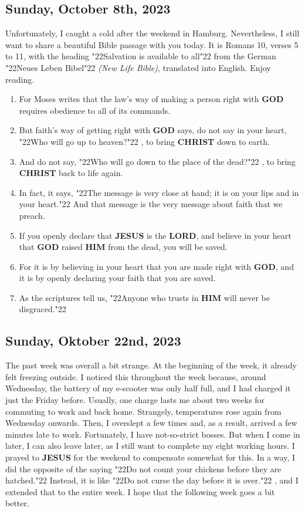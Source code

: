 \documentclass[12pt,a5paper]{article}
\newcommand{\Christ}[0]{\textbf{CHRIST}}
\newcommand{\God}[0]{\textbf{GOD}}
\newcommand{\Him}[0]{\textbf{HIM}}
\newcommand{\Jesus}[0]{\textbf{JESUS}}
\newcommand{\Lord}[0]{\textbf{LORD}}
\newcommand{\q}[1]{\char"22{#1}\char"22 }
\begin{document}
	\subsection{Sunday, October 8th, 2023}
		Unfortunately,
		I caught a cold after the weekend in Hamburg.
		Nevertheless,
		I still want to share a beautiful Bible passage with you today.
		It is Romans 10,
		verses 5 to 11,
		with the heading
		\q{Salvation is available to all}
		from the German \q{Neues Leben Bibel} \textit{(New Life Bible)},
		translated into English.
		Enjoy reading.
		\begin{enumerate}[nosep,start=5]
			\item	For Moses writes that the law’s way of making a person right with {\God} requires obedience to all of its commands.
			\item	But faith’s way of getting right with {\God} says,
					do not say in your heart,
					\q{Who will go up to heaven?},
					to bring {\Christ} down to earth.
			\item	And do not say,
					\q{Who will go down to the place of the dead?},
					to bring {\Christ} back to life again.
			\item	In fact,
					it says,
					\q{The message is very close at hand;
					it is on your lips and in your heart.}
					And that message is the very message about faith that we preach.
			\item	If you openly declare that {\Jesus} is the {\Lord},
					and believe in your heart that {\God} raised {\Him} from the dead,
					you will be saved.
			\item	For it is by believing in your heart that you are made right with {\God},
					and it is by openly declaring your faith that you are saved.
			\item	As the scriptures tell us,
					\q{Anyone who trusts in {\Him} will never be disgraced.}
		\end{enumerate}

	\subsection{Sunday, Oktober 22nd, 2023}
		The past week was overall a bit strange.
		At the beginning of the week,
		it already felt freezing outside.
		I noticed this throughout the week because,
		around Wednesday,
		the battery of my e-scooter was only half full,
		and I had charged it just the Friday before.
		Usually,
		one charge lasts me about two weeks for commuting to work and back home.
		Strangely,
		temperatures rose again from Wednesday onwards.
		Then,
		I overslept a few times and,
		as a result,
		arrived a few minutes late to work.
		Fortunately,
		I have not-so-strict bosses.
		But when I come in later,
		I can also leave later,
		as I still want to complete my eight working hours.
		I prayed to {\Jesus} for the weekend to compensate somewhat for this.
		In a way,
		I did the opposite of the saying \q{Do not count your chickens before they are hatched.}
		Instead,
		it is like \q{Do not curse the day before it is over.},
		and I extended that to the entire week.
		I hope that the following week goes a bit better.
				
\end{document}
